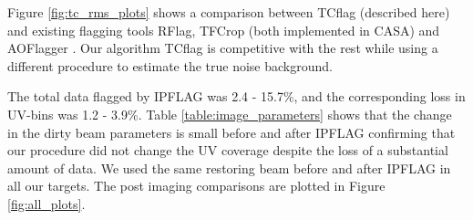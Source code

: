 \documentclass[twocolumn]{aastex61}
\begin{document}
{Figure \ref{fig:tc_rms_plots} shows a comparison between TCflag
(described here) and existing flagging tools RFlag, TFCrop (both implemented
in CASA) and AOFlagger \citep{offringa_morphological_2012,
offringa_post-correlation_2010}. Our algorithm TCflag is competitive with the
rest while using a different procedure to estimate the true noise background.

The total data flagged by IPFLAG was 2.4 - 15.7\%, and the corresponding loss in
UV-bins was 1.2 - 3.9\%.  Table \ref{table:image_parameters} shows that the
change in the dirty beam parameters is small before and after IPFLAG confirming
that our procedure did not change the UV coverage despite the loss of
a substantial amount of data. We used the same restoring beam before and after
IPFLAG in all our targets. The post imaging comparisons are plotted in Figure
\ref{fig:all_plots}.

}
\end{document}
